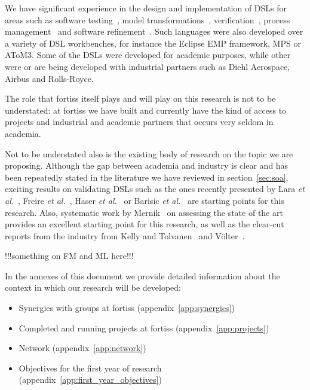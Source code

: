 \documentclass{scrartcl}
\begin{document}
We have significant experience in the design and implementation of DSLs for
areas such as software testing~\cite{lucio08}, model
transformations~\cite{BarrocaLAFS10}, verification~\cite{OakesTLW15,kanav18},
process management~\cite{LucioARAKH17} and software refinement~\cite{Syriani19}. Such
languages were also developed over a variety of DSL workbenches, for instance
the Eclipse EMP framework, MPS or AToM3. Some of the DSLs were developed for
academic purposes, while other were or are being developed with industrial
partners such as Diehl Aerospace, Airbus and Rolls-Royce.
 
The role that fortiss itself plays and will play on this research is not to be
understated: at fortiss we have built and currently have the kind of access to
projects and industrial and academic partners that occurs very seldom in academia.

Not to be understated also is the existing body of research on the topic we are
proposing. Although the gap between academia and industry is clear and has been
repeatedly stated in the literature we have reviewed in section~\ref{sec:soa},
exciting results on validating DSLs such as the ones recently presented
by Lara \emph{et al.}~\cite{LaraGuerra13}, Freire \emph{et al.}~\cite{Freire14}, 
Haser \emph{et al.}~\cite{Haser16} or Barisic \emph{et al.}~\cite{Barisic:12}
are starting points for this research. Also, systematic work by
Mernik~\cite{MernikHS05, Kosar2012, Mernik17} on assessing the state of the art
provides an excellent starting point for this research, as well as the clear-cut
reports from the industry from Kelly and Tolvanen~\cite{Tolvanen016, Kelly2009,
KellyTolvanen09, Kelly:2013, TolvanenKelly2016, Tolvanen018} and
V\"olter~\cite{Voelter09}.

!!!something on FM and ML here!!!

In the annexes of this document we provide detailed information about the
context in which our research will be developed:

\begin{itemize}
  \item Synergies with groups at fortiss (appendix~\ref{app:synergies})
  \item Completed and running projects at fortiss (appendix~\ref{app:projects})
  \item Network (appendix~\ref{app:network})
  \item Objectives for the first year of research (appendix~\ref{app:first_year_objectives})
\end{itemize}
\end{document}
